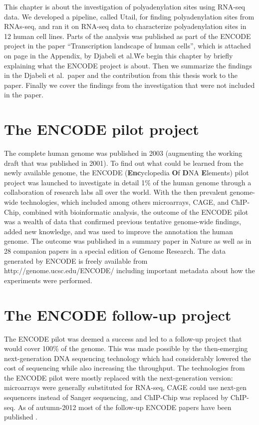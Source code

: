 %
This chapter is about the investigation of polyadenylation sites using RNA-seq
data. We developed a pipeline, called Utail, for finding polyadenylation sites
from RNAs-seq, and ran it on RNA-seq data to characterize polyadenylation sites
in 12 human cell lines. Parts of the analysis was published as part of the
ENCODE project in the paper ``Transcription landscape of human cells'', which
is attached on page \pageref{landscape} in the Appendix, by Djabeli et al.\.
We begin this chapter by briefly explaining what the ENCODE project is about.
Then we summarize the findings in the Djabeli et al.\ paper and the
contribution from this thesis work to the paper. Finally we cover the findings
from the investigation that were not included in the paper.

\section{The ENCODE pilot project}
The complete human genome was published in 2003 (augmenting the working draft
that was published in 2001). To find out what could be learned from the newly
available genome, the ENCODE (\textbf{Enc}yclopedia \textbf{O}f \textbf{D}NA
\textbf{E}lements) pilot project was launched to investigate in detail 1\% of
the human genome through a collaboration of research labs all over the world.
With the then prevalent genome-wide technologies, which included among others
microarrays, CAGE, and ChIP-Chip, combined with bioinformatic analysis, the
outcome of the ENCODE pilot was a wealth of data that confirmed previous
tentative genome-wide findings, added new knowledge, and was used to improve
the annotation the human genome. The outcome was published in a summary paper
in Nature \cite{birney_identification_2007} as well as in 28 companion papers
in a special edition of Genome Research. The data generated by ENCODE is freely
available from http://genome.ucsc.edu/ENCODE/ including important metadata
about how the experiments were performed.

\section{The ENCODE follow-up project}
The ENCODE pilot was deemed a success and led to a follow-up project that would
cover 100\% of the genome. This was made possible by the then-emerging
next-generation DNA sequencing technology which had considerably lowered the
cost of sequencing while also increasing the throughput. The technologies from
the ENCODE pilot were mostly replaced with the next-generation version:
microarrays were generally substituted for RNA-seq, CAGE could use next-gen
sequencers instead of Sanger sequencing, and ChIP-Chip was replaced by
ChIP-seq. As of autumn-2012 most of the follow-up ENCODE papers have been
published \cite{consortium_integrated_2012}.

